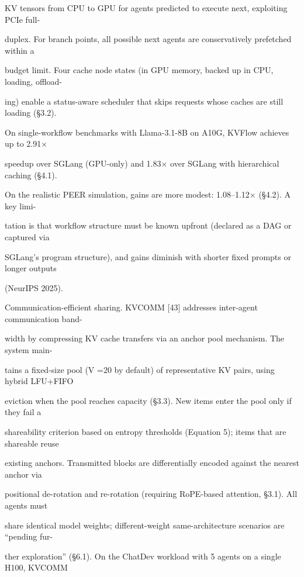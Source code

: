 \begin{flushleft}
\noindent KV tensors from CPU to GPU for agents predicted to execute next, exploiting PCIe full-\par
\noindent duplex. For branch points, all possible next agents are conservatively prefetched within a\par
\noindent budget limit. Four cache node states (in GPU memory, backed up in CPU, loading, offload-\par
\noindent ing) enable a status-aware scheduler that skips requests whose caches are still loading (§3.2).\par
\noindent On single-workflow benchmarks with Llama-3.1-8B on A10G, KVFlow achieves up to 2.91×\par
\noindent speedup over SGLang (GPU-only) and 1.83× over SGLang with hierarchical caching (§4.1).\par
\noindent On the realistic PEER simulation, gains are more modest: 1.08–1.12× (§4.2). A key limi-\par
\noindent tation is that workflow structure must be known upfront (declared as a DAG or captured via\par
\noindent SGLang’s program structure), and gains diminish with shorter fixed prompts or longer outputs\par
\noindent (NeurIPS 2025).\par
\par\smallskip
\noindent Communication-efficient sharing. KVCOMM [43] addresses inter-agent communication band-\par
\noindent width by compressing KV cache transfers via an anchor pool mechanism. The system main-\par
\noindent tains a fixed-size pool (V =20 by default) of representative KV pairs, using hybrid LFU+FIFO\par
\noindent eviction when the pool reaches capacity (§3.3). New items enter the pool only if they fail a\par
\noindent shareability criterion based on entropy thresholds (Equation 5); items that are shareable reuse\par
\noindent existing anchors. Transmitted blocks are differentially encoded against the nearest anchor via\par
\noindent positional de-rotation and re-rotation (requiring RoPE-based attention, §3.1). All agents must\par
\noindent share identical model weights; different-weight same-architecture scenarios are “pending fur-\par
\noindent ther exploration” (§6.1). On the ChatDev workload with 5 agents on a single H100, KVCOMM\par

\end{flushleft}
